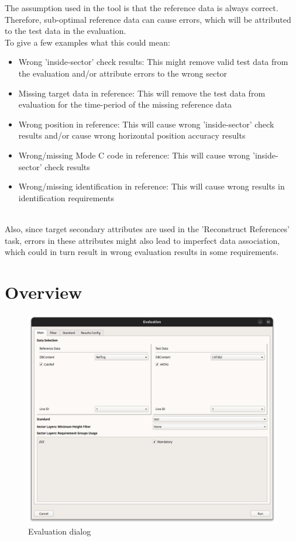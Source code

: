 The assumption used in the tool is that the reference data is always correct. Therefore, sub-optimal reference data can cause errors, which will be attributed to the test data in the evaluation. \\

To give a few examples what this could mean:
\begin{itemize}  
\item Wrong 'inside-sector' check results: This might remove valid test data from the evaluation and/or attribute errors to the wrong sector
\item Missing target data in reference: This will remove the test data from evaluation for the time-period of the missing reference data
\item Wrong position in reference: This will cause wrong 'inside-sector' check results and/or cause wrong horizontal position accuracy results
\item Wrong/missing Mode C code in reference: This will cause wrong 'inside-sector' check results
\item Wrong/missing identification in reference: This will cause wrong results in identification requirements
\end{itemize}
\ \\

Also, since target secondary attributes are used in the 'Reconstruct References' task, errors in these attributes might also lead to imperfect data association, which could in turn result in wrong evaluation results in some requirements.

\section{Overview}
\label{sec:eval_overview} 

\begin{figure}[H]
    \hspace*{-2.5cm}
    \includegraphics[width=19cm]{figures/eval_overview.png}
  \caption{Evaluation dialog}
\end{figure}

